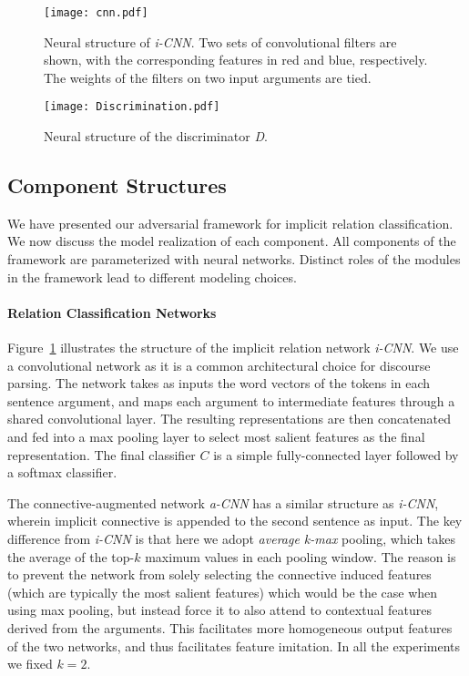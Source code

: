 \documentclass[11pt,a4paper]{article}
\begin{document}
\begin{figure}[t]
	\centering
	\texttt{[image: cnn.pdf]}
	\caption{Neural structure of {\it i-CNN}. Two sets of convolutional filters are shown, with the corresponding features in red and blue, respectively. The weights of the filters on two input arguments are tied.}
	\label{fig:icnn}
\end{figure}
%
\begin{figure}[!h]
	\centering
    \hspace{-20pt}
	\texttt{[image: Discrimination.pdf]}
	\caption{Neural structure of the discriminator {\it D}.}
	\label{fig:d}
\end{figure}

\subsection{Component Structures}\label{sec:components}
We have presented our adversarial framework for implicit relation classification. We now discuss the model realization of each component. All components of the framework are parameterized with neural networks. 
Distinct roles of the modules in the framework lead to different modeling choices. 

\paragraph{Relation Classification Networks}
Figure~\ref{fig:icnn} illustrates the structure of the implicit relation network {\it i-CNN}. We use a convolutional network as it is a common architectural choice for discourse parsing. The network takes as inputs the word vectors of the tokens in each sentence argument, and maps each argument to intermediate features through a shared convolutional layer. The resulting representations are then concatenated and fed into a max pooling layer to select most salient features as the final representation. The final classifier $C$ is a simple fully-connected layer followed by a softmax classifier.

The connective-augmented network {\it a-CNN} has a similar structure as {\it i-CNN}, wherein implicit connective is appended to the second sentence as input. The key difference from {\it i-CNN} is that here we adopt {\it average k-max} pooling, which takes the average of the top-$k$ maximum values in each pooling window.
The reason is to prevent the network from solely selecting the connective induced features (which are typically the most salient features) which would be the case when using max pooling, but instead force it to also attend to contextual features derived from the arguments. This facilitates more homogeneous output features of the two networks, and thus facilitates feature imitation. In all the experiments we fixed $k=2$.
\end{document}
